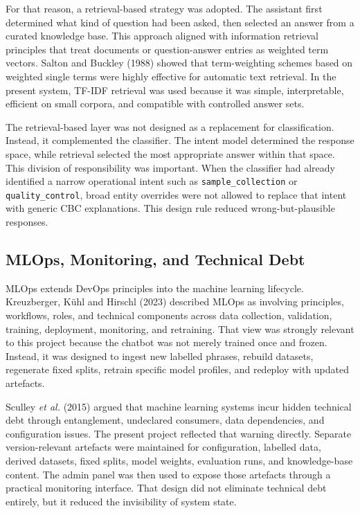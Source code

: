 For that reason, a retrieval-based strategy was adopted. The assistant first determined what kind of question had been asked, then selected an answer from a curated knowledge base. This approach aligned with information retrieval principles that treat documents or question-answer entries as weighted term vectors. Salton and Buckley (1988) showed that term-weighting schemes based on weighted single terms were highly effective for automatic text retrieval. In the present system, TF-IDF retrieval was used because it was simple, interpretable, efficient on small corpora, and compatible with controlled answer sets.

The retrieval-based layer was not designed as a replacement for classification. Instead, it complemented the classifier. The intent model determined the response space, while retrieval selected the most appropriate answer within that space. This division of responsibility was important. When the classifier had already identified a narrow operational intent such as \texttt{sample\_collection} or \texttt{quality\_control}, broad entity overrides were not allowed to replace that intent with generic CBC explanations. This design rule reduced wrong-but-plausible responses.

\subsection{MLOps, Monitoring, and Technical Debt}

MLOps extends DevOps principles into the machine learning lifecycle. Kreuzberger, Kühl and Hirschl (2023) described MLOps as involving principles, workflows, roles, and technical components across data collection, validation, training, deployment, monitoring, and retraining. That view was strongly relevant to this project because the chatbot was not merely trained once and frozen. Instead, it was designed to ingest new labelled phrases, rebuild datasets, regenerate fixed splits, retrain specific model profiles, and redeploy with updated artefacts.

Sculley \textit{et al.} (2015) argued that machine learning systems incur hidden technical debt through entanglement, undeclared consumers, data dependencies, and configuration issues. The present project reflected that warning directly. Separate version-relevant artefacts were maintained for configuration, labelled data, derived datasets, fixed splits, model weights, evaluation runs, and knowledge-base content. The admin panel was then used to expose those artefacts through a practical monitoring interface. That design did not eliminate technical debt entirely, but it reduced the invisibility of system state.

